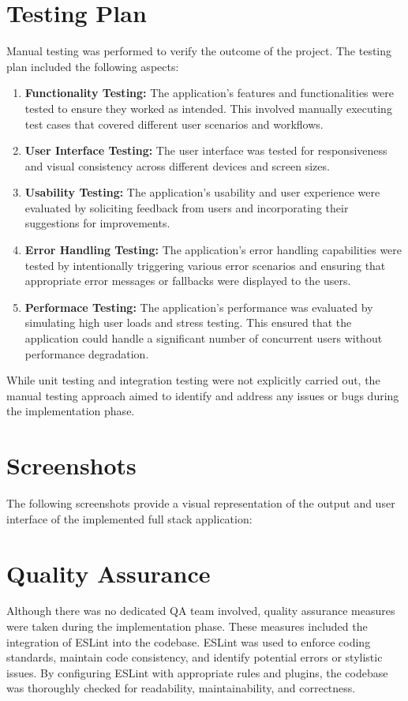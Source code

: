 \section{Testing Plan}
Manual testing was performed to verify the outcome of the project. The testing plan included the following aspects:

\begin{enumerate}
	\item \textbf{Functionality Testing: } The application's features and functionalities were tested to ensure they worked as intended. This involved manually executing test cases that covered different user scenarios and workflows.
	\item \textbf{User Interface Testing: } The user interface was tested for responsiveness and visual consistency across different devices and screen sizes.
	\item \textbf{Usability Testing: } The application's usability and user experience were evaluated by soliciting feedback from users and incorporating their suggestions for improvements.
	\item \textbf{Error Handling Testing: } The application's error handling capabilities were tested by intentionally triggering various error scenarios and ensuring that appropriate error messages or fallbacks were displayed to the users.
	\item \textbf{Performace Testing: } The application's performance was evaluated by simulating high user loads and stress testing. This ensured that the application could handle a significant number of concurrent users without performance degradation.
\end{enumerate}

While unit testing and integration testing were not explicitly carried out, the manual testing approach aimed to identify and address any issues or bugs during the implementation phase.

\section{Screenshots}
The following screenshots provide a visual representation of the output and user interface of the implemented full stack application:

\section{Quality Assurance}
Although there was no dedicated QA team involved, quality assurance measures were taken during the implementation phase. These measures included the integration of ESLint into the codebase. ESLint was used to enforce coding standards, maintain code consistency, and identify potential errors or stylistic issues. By configuring ESLint with appropriate rules and plugins, the codebase was thoroughly checked for readability, maintainability, and correctness.

